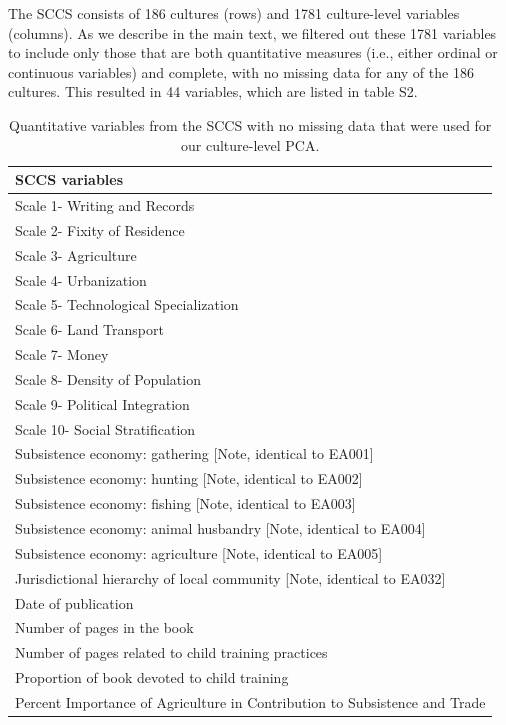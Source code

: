 \documentclass[
]{article}
\begin{document}
The SCCS consists of 186 cultures (rows) and 1781 culture-level variables (columns). As we describe in the main text, we filtered out these 1781 variables to include only those that are both quantitative measures (i.e., either ordinal or continuous variables) and complete, with no missing data for any of the 186 cultures. This resulted in 44 variables, which are listed in table S2.

\begin{table}

\caption{\label{tab:sccsvartable}Quantitative variables from the SCCS with no missing data that were used for our culture-level PCA.}
\centering
\fontsize{9}{11}\selectfont
\begin{tabular}[t]{l}
\toprule
SCCS variables\\
\midrule
Scale 1- Writing and Records\\
Scale 2- Fixity of Residence\\
Scale 3- Agriculture\\
Scale 4- Urbanization\\
Scale 5- Technological Specialization\\
\addlinespace
Scale 6- Land Transport\\
Scale 7- Money\\
Scale 8- Density of Population\\
Scale 9- Political Integration\\
Scale 10- Social Stratification\\
\addlinespace
Subsistence economy: gathering [Note, identical to EA001]\\
Subsistence economy: hunting [Note, identical to EA002]\\
Subsistence economy: fishing [Note, identical to EA003]\\
Subsistence economy: animal husbandry [Note, identical to EA004]\\
Subsistence economy: agriculture [Note, identical to EA005]\\
\addlinespace
Jurisdictional hierarchy of local community [Note, identical to EA032]\\
Date of publication\\
Number of pages in the book\\
Number of pages related to child training practices\\
Proportion of book devoted to child training\\
\addlinespace
Percent Importance of Agriculture in Contribution to Subsistence and Trade\\

\end{tabular}
\end{table}
\end{document}
